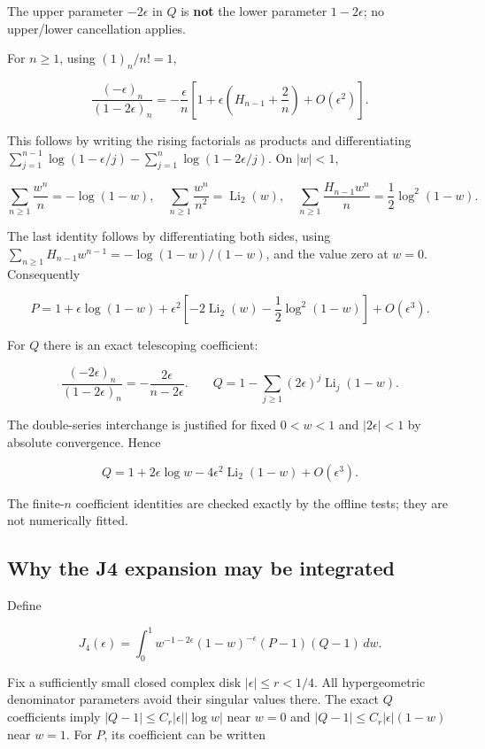 \documentclass[
  11pt,
]{article}
\begin{document}
The upper parameter \(-2\epsilon\) in \(Q\) is \textbf{not} the lower
parameter \(1-2\epsilon\); no upper/lower cancellation applies.

For \(n\geq1\), using \((1)_n/n!=1\),

\[\frac{(-\epsilon)_n}{(1-2\epsilon)_n}
=-\frac{\epsilon}{n}\left[1+\epsilon
\left(H_{n-1}+\frac2n\right)+O(\epsilon^2)\right].\]

This follows by writing the rising factorials as products and
differentiating \(\sum_{j=1}^{n-1}\log(1-\epsilon/j)
-\sum_{j=1}^{n}\log(1-2\epsilon/j)\). On \(|w|<1\),

\[\sum_{n\geq1}\frac{w^n}{n}=-\log(1-w),\quad
\sum_{n\geq1}\frac{w^n}{n^2}=\operatorname{Li}_2(w),\quad
\sum_{n\geq1}\frac{H_{n-1}w^n}{n}=\frac12\log^2(1-w).\]

The last identity follows by differentiating both sides, using
\(\sum_{n\geq1}H_{n-1}w^{n-1}=-\log(1-w)/(1-w)\), and the value zero at
\(w=0\). Consequently

\[P=1+\epsilon\log(1-w)
+\epsilon^2\left[-2\operatorname{Li}_2(w)-\frac12\log^2(1-w)\right]
+O(\epsilon^3).\]

For \(Q\) there is an exact telescoping coefficient:

\[\frac{(-2\epsilon)_n}{(1-2\epsilon)_n}=-\frac{2\epsilon}{n-2\epsilon}.
\qquad
Q=1-\sum_{j\geq1}(2\epsilon)^j\operatorname{Li}_j(1-w).\]

The double-series interchange is justified for fixed \(0<w<1\) and
\(|2\epsilon|<1\) by absolute convergence. Hence

\[Q=1+2\epsilon\log w-4\epsilon^2\operatorname{Li}_2(1-w)
+O(\epsilon^3).\]

The finite-\(n\) coefficient identities are checked exactly by the
offline tests; they are not numerically fitted.

\subsection{Why the J4 expansion may be
integrated}\label{why-the-j4-expansion-may-be-integrated}

Define

\[J_4(\epsilon)=\int_0^1
w^{-1-2\epsilon}(1-w)^{-\epsilon}(P-1)(Q-1)\,dw.\]

Fix a sufficiently small closed complex disk \(|\epsilon|\leq r<1/4\).
All hypergeometric denominator parameters avoid their singular values
there. The exact \(Q\) coefficients imply
\(|Q-1|\leq C_r|\epsilon||\log w|\) near \(w=0\) and
\(|Q-1|\leq C_r|\epsilon|(1-w)\) near \(w=1\). For \(P\), its
coefficient can be written
\end{document}
